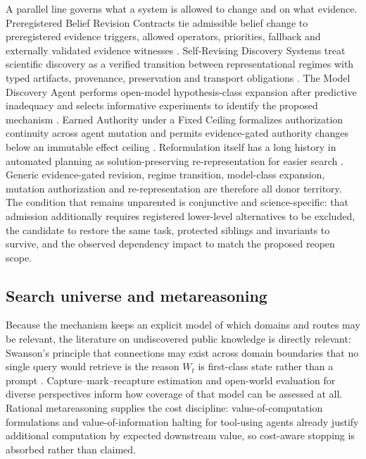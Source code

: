 A parallel line governs what a system is allowed to change and on what evidence.
Preregistered Belief Revision Contracts tie admissible belief change to
preregistered evidence triggers, allowed operators, priorities, fallback and
externally validated evidence witnesses \cite{pbrc2026}. Self-Revising Discovery
Systems treat scientific discovery as a verified transition between
representational regimes with typed artifacts, provenance, preservation and
transport obligations \cite{selfrevisingdiscovery2026}. The Model Discovery
Agent performs open-model hypothesis-class expansion after predictive inadequacy
and selects informative experiments to identify the proposed mechanism
\cite{modeldiscoveryagent2026}. Earned Authority under a Fixed Ceiling
formalizes authorization continuity across agent mutation and permits
evidence-gated authority changes below an immutable effect ceiling
\cite{earnedauthority2026}. Reformulation itself has a long history in automated
planning as solution-preserving re-representation for easier search
\cite{reformulation2023}. Generic evidence-gated revision, regime transition,
model-class expansion, mutation authorization and re-representation are
therefore all donor territory. The condition that remains unparented is
conjunctive and science-specific: that admission additionally requires
registered lower-level alternatives to be excluded, the candidate to restore the
same task, protected siblings and invariants to survive, and the observed
dependency impact to match the proposed reopen scope.

\subsection{Search universe and metareasoning}

Because the mechanism keeps an explicit model of which domains and routes may be
relevant, the literature on undiscovered public knowledge is directly relevant:
Swanson's principle that connections may exist across domain boundaries that no
single query would retrieve is the reason $W_t$ is first-class state rather than
a prompt \cite{swanson1986}. Capture--mark--recapture estimation
\cite{kastner2009} and open-world evaluation for diverse perspectives
\cite{chenchoi2025} inform how coverage of that model can be assessed at all.
Rational metareasoning supplies the cost discipline: value-of-computation
formulations \cite{desabbata2024} and value-of-information halting for
tool-using agents \cite{cognitivefriction2026} already justify additional
computation by expected downstream value, so cost-aware stopping is absorbed
rather than claimed.

